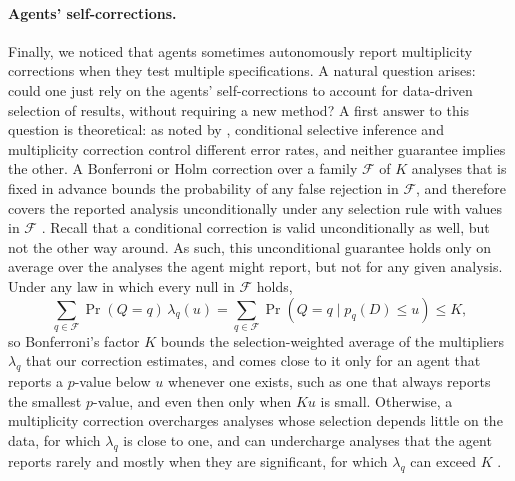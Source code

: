 \documentclass[10pt]{article}
\begin{document}
\paragraph{Agents' self-corrections.} Finally, we noticed that agents sometimes autonomously report multiplicity corrections when they test multiple specifications. A natural question arises: could one just rely on the agents' self-corrections to account for data-driven selection of results, without requiring a new method? A first answer to this question is theoretical: as noted by \citet[Section 2.3]{fithian2014optimal}, conditional selective inference and multiplicity correction control different error rates, and neither guarantee implies the other. A Bonferroni or Holm correction over a family $\mathcal F$ of $K$ analyses that is fixed in advance bounds the probability of any false rejection in $\mathcal F$, and therefore covers the reported analysis unconditionally under any selection rule with values in $\mathcal F$ \citep{berk2013valid}. Recall \citep[e.g.][]{fithian2014optimal} that a conditional correction is valid unconditionally as well, but not the other way around. As such, this unconditional guarantee holds only on average over the analyses the agent might report, but not for any given analysis. Under any law in which every null in $\mathcal F$ holds,
\[
\sum_{q\in\mathcal F}\Pr(Q=q)\,\lambda_q(u)
=\sum_{q\in\mathcal F}\Pr\!\left(Q=q\mid p_q(D)\le u\right)
\le K,
\]
so Bonferroni's factor $K$ bounds the selection-weighted average of the multipliers $\lambda_q$ that our correction estimates, and comes close to it only for an agent that reports a $p$-value below $u$ whenever one exists, such as one that always reports the smallest $p$-value, and even then only when $Ku$ is small. Otherwise, a multiplicity correction overcharges analyses whose selection depends little on the data, for which $\lambda_q$ is close to one, and can undercharge analyses that the agent reports rarely and mostly when they are significant, for which $\lambda_q$ can exceed $K$ \citep[see also][]{andrews2024inference, neufeld2026inference}.
\end{document}
